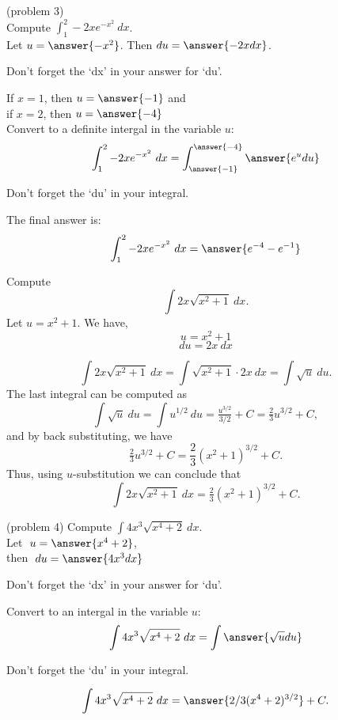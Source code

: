 \documentclass[handout]{ximera}
\begin{document}
\begin{problem}(problem 3)\\
Compute $\displaystyle{\int_1^2 -2xe^{-x^2} \ dx}$.\\
Let $u = \answer{-x^2}$. Then $du = \answer{-2x dx}$.\\
\begin{hint}
Don't forget the `dx' in your answer for `du'.
\end{hint}
If $x = 1$, then $u = \answer{-1}$ and \\
if $x = 2$, then $u = \answer{-4}$\\
Convert to a definite intergal in the variable $u$:
\[\int_1^2 -2xe^{-x^2} \ dx = \int_{\answer{-1}}^{\answer{-4}} \answer{e^u du}\]
\begin{hint}
Don't forget the `du' in your integral.
\end{hint}
The final answer is:
\[\int_1^2 -2xe^{-x^2} \ dx = \answer{e^{-4} - e^{-1}} \]
\end{problem}

\begin{example}[example 4] Compute 
\[\int 2x\sqrt{x^2 + 1} \ dx.\]
Let $u = x^2 + 1$.  We have,
\[u = x^2 + 1\]
\[du = 2x \ dx\]

\[\int 2x\sqrt{x^2 + 1} \ dx = \int \sqrt{x^2 + 1} \cdot 2x\  dx = \int \sqrt{u} \ du.\]
The last integral can be computed as 
\[\int \sqrt u  \ du = \int u^{1/2} \ du = \tfrac{u^{3/2}}{3/2} + C = \tfrac23 u^{3/2} + C,\]
and by back substituting, we have 
\[\tfrac23 u^{3/2}  + C = \frac23 (x^2 + 1)^{3/2} + C.\]
Thus, using $u$-substitution we can conclude that
\[\int 2x\sqrt{x^2 + 1} \ dx =  \tfrac23 (x^2 + 1)^{3/2} + C.\]
\end{example}

\begin{problem}(problem 4) Compute $\displaystyle{\int 4x^3 \sqrt{x^4 +2} \ dx}$.\\
Let $\;u = \answer{x^4 + 2}$,\\
then $\;du = \answer{4x^3 dx}$\\
\begin{hint}
Don't forget the `dx' in your answer for `du'.
\end{hint}
Convert to an intergal in the variable $u$:
\[\int 4x^3 \sqrt{x^4 +2} \ dx = \int\answer{\sqrt u du}\]
\begin{hint}
Don't forget the `du' in your integral.
\end{hint}

\[\int 4x^3 \sqrt{x^4 +2} \ dx = \answer{2/3(x^4 +2)^{3/2}} +C.\]
\end{problem}
\end{document}
